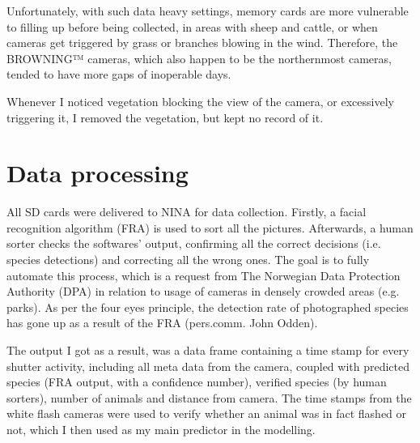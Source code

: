 Unfortunately, with such data heavy settings, memory cards are more vulnerable to filling up before being collected, in areas with sheep and cattle, or when cameras get triggered by grass or branches blowing in the wind. Therefore, the BROWNING™ cameras, which also happen to be the northernmost cameras, tended to have more gaps of inoperable days. %

Whenever I noticed vegetation blocking the view of the camera, or excessively triggering it, I removed the vegetation, but kept no record of it.









\section{Data processing} %
All SD cards were delivered to NINA for data collection. Firstly, a facial recognition algorithm (FRA)  is used to sort all the pictures. %
Afterwards, a human sorter checks the softwares' output, confirming all the correct decisions (i.e. species detections) and correcting all the wrong ones.
The goal is to fully automate this process, which is a request from The Norwegian Data Protection Authority (DPA) in relation to usage of cameras in densely crowded areas (e.g. parks).
As per the four eyes principle, the detection rate of photographed species has gone up as a result of the FRA (pers.comm. John Odden). 



The output I got as a result, was a data frame containing a time stamp for every shutter activity, %
including all meta data from the camera, coupled with predicted species (FRA output, with a confidence number), verified species (by human sorters), number of animals and distance from camera. The time stamps from the white flash cameras were used to verify whether an animal was in fact flashed or not, which I then used as my main predictor in the modelling. 



